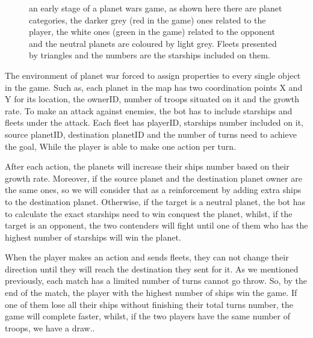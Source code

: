\documentclass[]{interact}
\theoremstyle{plain}%
\theoremstyle{definition}
\theoremstyle{remark}
\begin{document}
\begin{figure}
\caption{an early stage of a planet wars game, as shown here there are planet categories, the darker grey (red in the game) ones related to the player, the white ones (green in the game) related to the opponent and the neutral planets are coloured by light grey. Fleets presented by triangles and the numbers are the starships included on them.}
\end{figure}

The environment of planet war forced to assign properties to every single object in the game.\cite{doc1} Such as, each planet in the map has two coordination points X and Y for its location, the ownerID, number of troops situated on it and the growth rate. To make an attack against enemies, the bot has to include starships and fleets under the attack. Each fleet has playerID, starships number included on it, source planetID, destination planetID and the number of turns need to achieve the goal, While the player is able to make one action per turn.\cite{doc1}

After each action, the planets will increase their ships number based on their growth rate.\cite{doc5} Moreover, if the source planet and the destination planet owner are the same ones, so we will consider that as a reinforcement by adding extra ships to the destination planet. Otherwise, if the target is a neutral planet, the bot has to calculate the exact starships need to win conquest the planet, whilst, if the target is an opponent, the two contenders will fight until one of them who has the highest number of starships will win the planet.\cite{doc1,doc5}

When the player makes an action and sends fleets, they can not change their direction until they will reach the destination they sent for it. As we mentioned previously, each match has a limited number of turns cannot go throw. So, by the end of the match, the player with the highest number of ships win the game. If one of them lose all their ships without finishing their total turns number, the game will complete faster, whilst, if the two players have the same number of troops, we have a draw.\cite{doc5}. 
\end{document}
